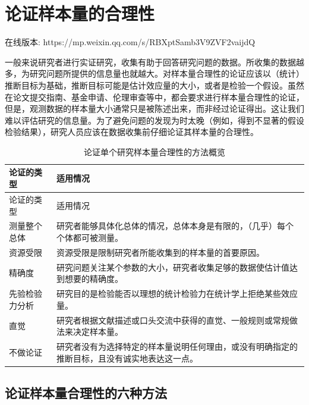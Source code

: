 \documentclass[
  letterpaper,
  DIV=11,
  numbers=noendperiod]{scrreprt}
\begin{document}

\hypertarget{sec-power}{%
\chapter{论证样本量的合理性}\label{sec-power}}

在线版本: https://mp.weixin.qq.com/s/RBXptSamb3V9ZVF2vaijdQ

一般来说研究者进行实证研究，收集有助于回答研究问题的数据。所收集的数据越多，为研究问题所提供的信息量也就越大。对样本量合理性的论证应该以（统计）推断目标为基础，推断目标可能是估计效应量的大小，或者是检验一个假设。虽然在论文提交指南、基金申请、伦理审查等中，都会要求进行样本量合理性的论证，但是，观测数据的样本量大小通常只是被陈述出来，而非经过论证得出。这让我们难以评估研究的信息量。为了避免问题的发现为时太晚（例如，得到不显著的假设检验结果），研究人员应该在数据收集前仔细论证其样本量的合理性。

\hypertarget{tbl-table-pow-just}{}
\begin{longtable}[]{@{}ll@{}}
\caption{\label{tbl-table-pow-just}论证单个研究样本量合理性的方法概览}\tabularnewline
\toprule\noalign{}
论证的类型 & 适用情况 \\
\midrule\noalign{}
\endfirsthead
\toprule\noalign{}
论证的类型 & 适用情况 \\
\midrule\noalign{}
\endhead
\bottomrule\noalign{}
\endlastfoot
测量整个总体 &
研究者能够具体化总体的情况，总体本身是有限的，（几乎）每个个体都可被测量。 \\
资源受限 & 资源受限是限制研究者所能收集到的样本量的首要原因。 \\
精确度 &
研究问题关注某个参数的大小，研究者收集足够的数据使估计值达到想要的精确度。 \\
先验检验力分析 &
研究目的是检验能否以理想的统计检验力在统计学上拒绝某些效应量。 \\
直觉 &
研究者根据文献描述或口头交流中获得的直觉、一般规则或常规做法来决定样本量。 \\
不做论证 &
研究者没有为选择特定的样本量说明任何理由，或没有明确指定的推断目标，且没有诚实地表达这一点。 \\
\end{longtable}

\hypertarget{ux8bbaux8bc1ux6837ux672cux91cfux5408ux7406ux6027ux7684ux516dux79cdux65b9ux6cd5}{%
\section{论证样本量合理性的六种方法}\label{ux8bbaux8bc1ux6837ux672cux91cfux5408ux7406ux6027ux7684ux516dux79cdux65b9ux6cd5}}
\end{document}
